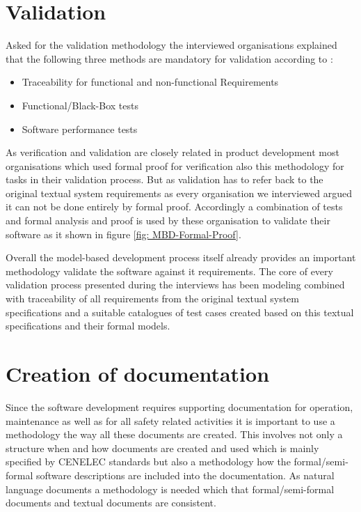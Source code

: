 \documentclass{./template/openetcs2}
\begin{document}
\section{Validation}

Asked for the validation methodology the interviewed organisations explained that the following three methods are mandatory for validation according to \citeauthor{EN50128:2011}:

\vspace{-10pt}
\begin{itemize}[topsep=2pt, partopsep=2pt,itemsep=2pt,parsep=2pt]
\item Traceability for functional and non-functional Requirements
\item Functional/Black-Box tests
\item Software performance tests
\end{itemize}

As verification and validation are closely related in product development most organisations which used formal proof for verification also this methodology for tasks in their validation process. But as validation has to refer back to the original textual system requirements as every organisation we interviewed argued it can not be done entirely by formal proof. Accordingly a combination of tests and formal analysis and proof is used by these organisation to validate their software as it shown in figure \ref{fig: MBD-Formal-Proof}. 

Overall the model-based development process itself already provides an important methodology validate the software against it requirements. The core of every validation process presented during the interviews has been modeling combined with traceability of all requirements from the original textual system specifications and a suitable catalogues of test cases created based on this textual specifications and their formal models.

\section{Creation of documentation}

Since the software development requires supporting documentation for operation, maintenance as well as for all safety related activities it is important to use a methodology the way all these documents are created. This involves not only a structure when and how documents are created and used which is mainly specified by CENELEC standards but also a methodology how the formal/semi-formal software descriptions are included into the documentation. As natural language documents a methodology is needed which that formal/semi-formal documents and textual documents are consistent.
\end{document}
